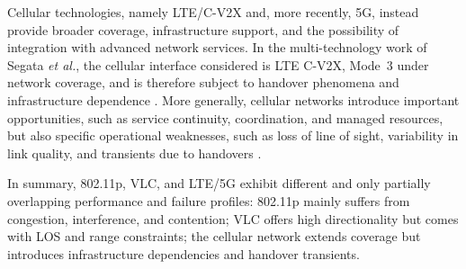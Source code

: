 Cellular technologies, namely LTE/C-V2X and, more recently, 5G, instead provide broader coverage, infrastructure support, and the possibility of integration with advanced network services. In the multi-technology work of Segata \emph{et al.}, the cellular interface considered is LTE C-V2X, Mode~3 under network coverage, and is therefore subject to handover phenomena and infrastructure dependence \cite{segata2023multi-technology,3gpp-21914-1400}. More generally, cellular networks introduce important opportunities, such as service continuity, coordination, and managed resources, but also specific operational weaknesses, such as loss of line of sight, variability in link quality, and transients due to handovers \cite{bazzi2020wireless}.

In summary, 802.11p, VLC, and LTE/5G exhibit different and only partially overlapping performance and failure profiles: 802.11p mainly suffers from congestion, interference, and contention; VLC offers high directionality but comes with LOS and range constraints; the cellular network extends coverage but introduces infrastructure dependencies and handover transients.
